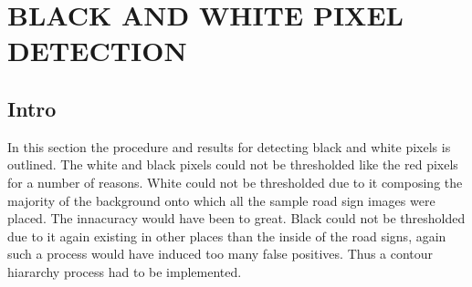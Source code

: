 \documentclass{article}
\begin{document}
\pagebreak
\section{BLACK AND WHITE PIXEL DETECTION}
\subsection{Intro}\label{sec:intro}
In this section the procedure and results for detecting black and white pixels is outlined. The white and black pixels could not be thresholded like the red pixels for a number of reasons. White could not be thresholded due to it composing the majority of the background onto which all the sample road sign images were placed. The innacuracy would have been to great. Black could not be thresholded due to it again existing in other places than the inside of the road signs, again such a process would have induced too many false positives. Thus a contour hiararchy process had to be implemented.\\
\end{document}
